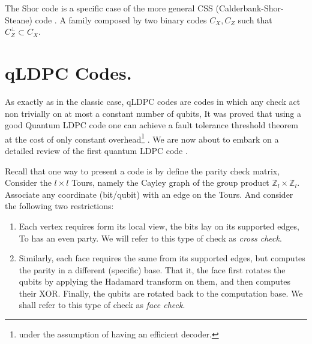 The Shor code is a specific case of the more general CSS (Calderbank-Shor-Steane) code \cite{Calderbank_1996}. A family composed by two binary codes $C_{X}, C_{Z}$ such that $C_{Z}^{\perp} \subset C_{X}$. 



  \section{qLDPC Codes.}
  As exactly as in the classic case, qLDPC codes are codes in which any check act non trivially on at most a constant number of qubits, It was proved that using a good Quantum LDPC code one can achieve a fault tolerance threshold theorem at the cost of only constant overhead\footnote{under the assumption of having an efficient decoder.} \cite{gottesman2014faulttolerant}. We are now about to embark on a detailed review of the first quantum LDPC code \cite{Dennis_2002}. 

  Recall that one way to present a code is by define the parity check matrix, Consider the $l\times l$ Tours, namely the Cayley graph of the group product  $\mathbb{Z}_{l} \times \mathbb{Z}_{l}$. Associate any coordinate (bit/qubit) with an edge on the Tours. And consider the following two restrictions:

  \begin{enumerate}
    \item Each vertex requires form its local view, the bits lay on its supported edges, To has an even party. We will refer to this type of check as \textit{cross check}. 
    \item Similarly, each face requires the same from its supported edges, but computes the parity in a different (specific) base. That it, the face first rotates the qubits by applying the Hadamard transform on them, and then computes their XOR. Finally, the qubits are rotated back to the computation base. We shall refer to this type of check as \textit{face check}.
  \end{enumerate}

